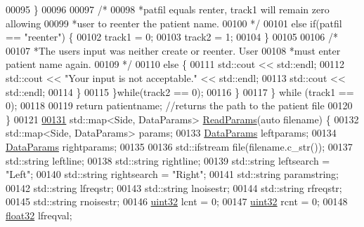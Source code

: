 \begin{DoxyCode}
00095                     \}
00096 
00097                     \textcolor{comment}{/*}
00098 \textcolor{comment}{                     *patfil equals renter, track1 will remain zero allowing}
00099 \textcolor{comment}{                     *user to reenter the patient name.}
00100 \textcolor{comment}{                     */}
00101                     \textcolor{keywordflow}{else} \textcolor{keywordflow}{if}(patfil == \textcolor{stringliteral}{"reenter"}) \{
00102                         track1 = 0;
00103                         track2 = 1;
00104                     \}
00105 
00106                     \textcolor{comment}{/*}
00107 \textcolor{comment}{                     *The users input was neither create or reenter. User}
00108 \textcolor{comment}{                     *must enter patient name again.}
00109 \textcolor{comment}{                     */}
00110                     \textcolor{keywordflow}{else} \{
00111                         std::cout << std::endl;
00112                         std::cout << \textcolor{stringliteral}{"Your input is not acceptable."} << std::endl;
00113                         std::cout << std::endl;
00114                     \}
00115                 \}\textcolor{keywordflow}{while}(track2 == 0);
00116             \}
00117         \} \textcolor{keywordflow}{while} (track1 == 0);
00118 
00119         \textcolor{keywordflow}{return} patientname; \textcolor{comment}{//returns the path to the patient file}
00120     \}
00121 
\hypertarget{fileio_8hpp_source_l00131}{}\hyperlink{namespaceavda_a46dc980b65ddfc24749ce25c1290e158}{00131}     std::map<Side, DataParams> \hyperlink{namespaceavda_a46dc980b65ddfc24749ce25c1290e158}{ReadParams}(\textcolor{keyword}{auto} filename) \{
00132         std::map<Side, DataParams> params;
00133         \hyperlink{structDataParams}{DataParams} leftparams;
00134         \hyperlink{structDataParams}{DataParams} rightparams;
00135 
00136         std::ifstream file(filename.c\_str());
00137         std::string leftline;
00138         std::string rightline;
00139         std::string leftsearch = \textcolor{stringliteral}{"Left"};
00140         std::string rightsearch = \textcolor{stringliteral}{"Right"};
00141         std::string paramstring;
00142         std::string lfreqstr;
00143         std::string lnoisestr;
00144         std::string rfreqstr;
00145         std::string rnoisestr;
00146         \hyperlink{definitions_8hpp_a1134b580f8da4de94ca6b1de4d37975e}{uint32} lcnt = 0;
00147         \hyperlink{definitions_8hpp_a1134b580f8da4de94ca6b1de4d37975e}{uint32} rcnt = 0;
00148         \hyperlink{definitions_8hpp_aacdc525d6f7bddb3ae95d5c311bd06a1}{float32} lfreqval;

\end{DoxyCode}
